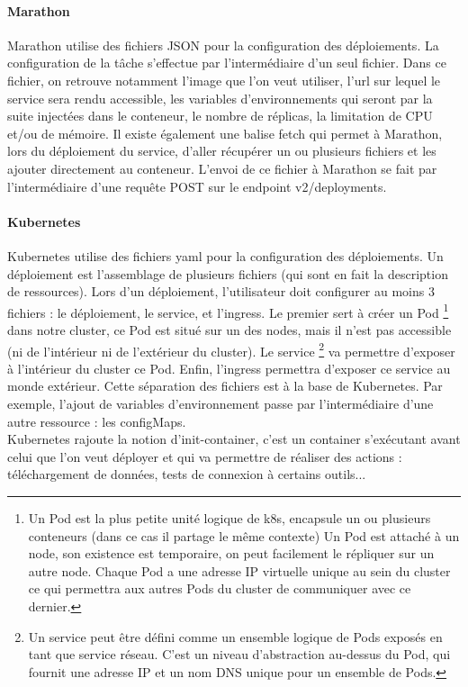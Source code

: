 \documentclass[11pt,fleqn]{book} %
\begin{document}
\paragraph{Marathon}
 Marathon utilise des fichiers JSON pour la configuration des déploiements. La configuration de la tâche s'effectue par l'intermédiaire d'un seul fichier. Dans ce fichier, on retrouve notamment l'image que l'on veut utiliser, l'url sur lequel le service sera rendu accessible, les variables d'environnements qui seront par la suite injectées dans le conteneur, le nombre de réplicas, la limitation de CPU et/ou de mémoire. Il existe également une balise fetch qui permet à Marathon, lors du déploiement du service, d'aller récupérer un ou plusieurs fichiers et les ajouter directement au conteneur. L'envoi de ce fichier à Marathon se fait par l'intermédiaire d'une requête POST sur le endpoint v2/deployments.
\paragraph{Kubernetes}
Kubernetes utilise des fichiers yaml pour la configuration des déploiements. Un déploiement est l'assemblage de plusieurs fichiers (qui sont en fait la description de ressources). Lors d'un déploiement, l'utilisateur doit configurer au moins 3 fichiers : le déploiement, le service, et l'ingress. Le premier sert à créer un Pod \footnote{Un Pod est la plus petite unité logique de k8s, encapsule un ou plusieurs conteneurs (dans ce cas il partage le même contexte) Un Pod est attaché à un node, son existence est temporaire, on peut facilement le répliquer sur un autre node. Chaque Pod a une adresse IP virtuelle unique au sein du cluster ce qui permettra aux autres Pods du cluster de communiquer avec ce dernier.} dans notre cluster, ce Pod est situé sur un des nodes, mais il n'est pas accessible (ni de l'intérieur ni de l'extérieur du cluster). Le service \footnote{Un service peut être défini comme un ensemble logique de Pods exposés en tant que service réseau. C'est un niveau d'abstraction au-dessus du Pod, qui fournit une adresse IP et un nom DNS unique pour un ensemble de Pods.} va permettre d'exposer à l'intérieur du cluster ce Pod. Enfin, l'ingress permettra d'exposer ce service au monde extérieur. Cette séparation des fichiers est à la base de Kubernetes. Par exemple, l'ajout de variables d'environnement passe par l'intermédiaire d'une autre ressource : les configMaps.\\

Kubernetes rajoute la notion d'init-container, c'est un container s'exécutant avant celui que l'on veut déployer et qui va permettre de réaliser des actions : téléchargement de données, tests de connexion à certains outils... 
\end{document}
